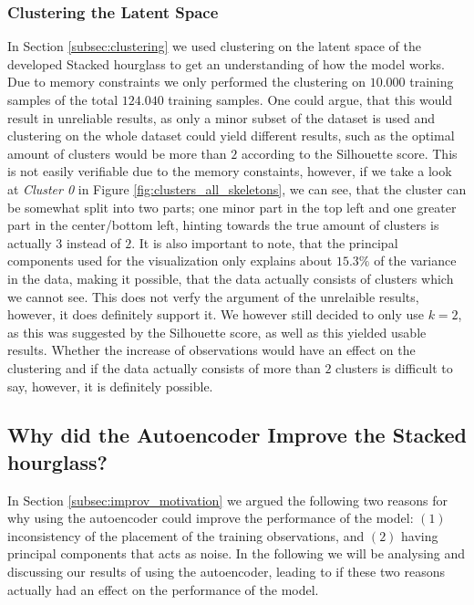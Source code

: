 \documentclass[./main.tex]{subfiles}
\begin{document}
\subsubsection{Clustering the Latent Space}
In Section \ref{subsec:clustering} we used clustering on the latent space of the developed Stacked hourglass to get an understanding of how the model works. Due to memory constraints we only performed the clustering on $10.000$ training samples of the total $124.040$ training samples.  One could argue, that this would result in unreliable results, as only a minor subset of the dataset is used and clustering on the whole dataset could yield different results, such as the optimal amount of clusters would be more than $2$ according to the Silhouette score. This is not easily verifiable due to the memory constaints, however, if we take a look at \textit{Cluster 0} in Figure \ref{fig:clusters_all_skeletons}, we can see, that the cluster can be somewhat split into two parts; one minor part in the top left and one greater part in the center/bottom left, hinting towards the true amount of clusters is actually $3$ instead of $2$. It is also important to note, that the principal components used for the visualization only explains about $15.3\%$ of the variance in the data, making it possible, that the data actually consists of clusters which we cannot see. This does not verfy the argument of the unrelaible results, however, it does definitely support it. We however still decided to only use $k = 2$, as this was suggested by the Silhouette score, as well as this yielded usable results. Whether the increase of observations would have an effect on the clustering and if the data actually consists of more than $2$ clusters is difficult to say, however, it is definitely possible.

\subsection{Why did the Autoencoder Improve the Stacked hourglass?}\label{subsec:why_improvement}
In Section \ref{subsec:improv_motivation} we argued the following two reasons for why using the autoencoder could improve the performance of the model: $(1)$ inconsistency of the placement of the training observations, and $(2)$ having principal components that acts as noise. In the following we will be analysing and discussing our results of using the autoencoder, leading to if these two reasons actually had an effect on the performance of the model.
\end{document}
